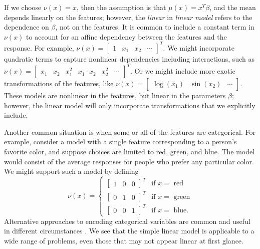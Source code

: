 \documentclass[12pt]{article}
\begin{document}
If we choose $\nu(x) = x$, then the assumption is that $\mu(x) = x^T \beta$, and the mean depends linearly on the features; however, the \textit{linear} in \textit{linear model} refers to the dependence on $\beta$, not on the features. It is common to include a constant term in $\nu(x)$ to account for an affine dependency between the features and the response. For example, $\nu(x) = \begin{bmatrix} 1 & x_1 & x_2 & \cdots \end{bmatrix}^T$. We might incorporate quadratic terms to capture nonlinear dependencies including interactions, such as $\nu(x) = \begin{bmatrix}x_1 & x_2 & x_1^2 & x_1 \cdot x_2 & x_2^2 & \cdots \end{bmatrix}^T$. Or we might include more exotic transformations of the features, like $\nu(x) = \begin{bmatrix} \log(x_1) & \sin(x_2) & \cdots \end{bmatrix}$. These models are nonlinear in the features, but linear in the parameters $\beta$; however, the linear model will only incorporate transformations that we explicitly include.

Another common situation is when some or all of the features are categorical. For example, consider a model with a single feature corresponding to a person's favorite color, and suppose choices are limited to red, green, and blue. The model would consist of the average responses for people who prefer any particular color. We might support such a model by defining
\begin{displaymath}
   \nu(x) = \begin{cases}
       \begin{bmatrix} 1 & 0 & 0 \end{bmatrix}^T & \textrm{if $x = $ red} \\
       \begin{bmatrix} 0 & 1 & 0 \end{bmatrix}^T & \textrm{if $x = $ green} \\
       \begin{bmatrix} 0 & 0 & 1 \end{bmatrix}^T & \textrm{if $x = $ blue.}
   \end{cases}
\end{displaymath}
Alternative approaches to encoding categorical variables are common and useful in different circumstances \cite{Agresti:2012}. We see that the simple linear model is applicable to a wide range of problems, even those that may not appear linear at first glance.
\end{document}
